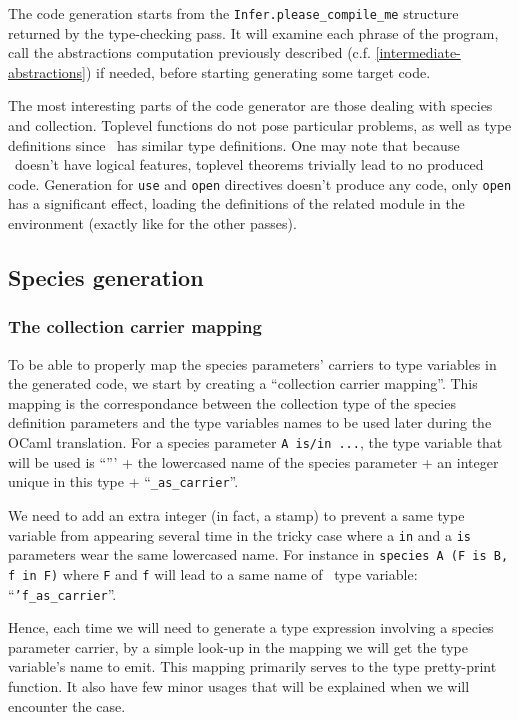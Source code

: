 
The code generation starts from the {\tt Infer.please\_compile\_me}
structure returned by the type-checking pass. It will examine each
phrase of the program, call the abstractions computation previously
described (c.f. \ref{intermediate-abstractions}) if needed, before
starting generating some target code.

The most interesting parts of the code generator are those dealing
with species and collection. Toplevel functions do not pose particular
problems, as well as type definitions since \ocaml\ has similar type
definitions. One may note that because \ocaml\ doesn't have logical
features, toplevel theorems trivially lead to no produced
code. Generation for {\tt use} and {\tt open} directives doesn't
produce any code, only {\tt open} has a significant effect, loading
the definitions of the related module in the environment (exactly like
for the other passes).


\subsection{Species generation}

\subsubsection{The collection carrier mapping}
To be able to properly map the species parameters' carriers to
type variables in the generated code, we start by creating a
``collection carrier mapping''. This mapping is the correspondance
between the collection type of the species definition parameters and
the type variables names to be used later during the OCaml
translation. For a species parameter {\tt A is/in ...}, the type
variable that will be used is ``''' + the lowercased name of the
species parameter + an integer unique in this type +
``{\tt \_as\_carrier}''.

We need to add an extra integer (in fact, a stamp) to prevent a same
type variable from appearing several time in the tricky case where a
{\tt in} and a {\tt is} parameters wear the same lowercased name. For
instance in
{\footnotesize\lstinline!species A (F is B, f in F)!}
where {\tt F} and {\tt f} will lead to a same name of \ocaml\ type
variable: ``{\tt 'f\_as\_carrier}''.

Hence, each time we will need to generate a type expression involving
a species parameter carrier, by a simple look-up in the mapping we
will get the type variable's name to emit. This mapping primarily
serves to the type pretty-print function. It also have few minor
usages that will be explained when we will encounter the case.


